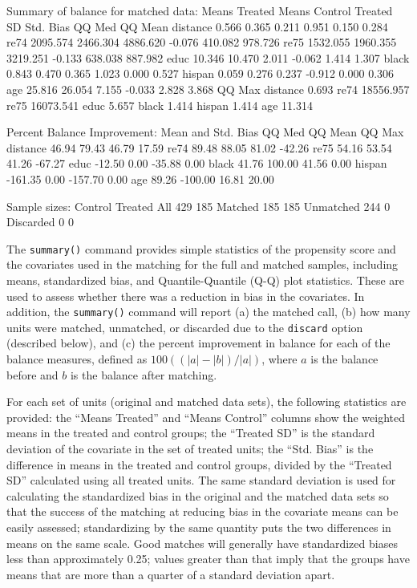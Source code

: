 \documentclass[oneside,letterpaper,titlepage]{article}
\begin{document}
\begin{enumerate}
\begin{Schunk}
\begin{Soutput}
Summary of balance for matched data:
         Means Treated Means Control Treated SD Std. Bias  QQ Med QQ Mean
distance         0.566         0.365      0.211     0.951   0.150   0.284
re74          2095.574      2466.304   4886.620    -0.076 410.082 978.726
re75          1532.055      1960.355   3219.251    -0.133 638.038 887.982
educ            10.346        10.470      2.011    -0.062   1.414   1.307
black            0.843         0.470      0.365     1.023   0.000   0.527
hispan           0.059         0.276      0.237    -0.912   0.000   0.306
age             25.816        26.054      7.155    -0.033   2.828   3.868
            QQ Max
distance     0.693
re74     18556.957
re75     16073.541
educ         5.657
black        1.414
hispan       1.414
age         11.314

Percent Balance Improvement:
         Mean and Std. Bias  QQ Med QQ Mean QQ Max
distance              46.94   79.43   46.79  17.59
re74                  89.48   88.05   81.02 -42.26
re75                  54.16   53.54   41.26 -67.27
educ                 -12.50    0.00  -35.88   0.00
black                 41.76  100.00   41.56   0.00
hispan              -161.35    0.00 -157.70   0.00
age                   89.26 -100.00   16.81  20.00

Sample sizes:
          Control Treated
All           429     185
Matched       185     185
Unmatched     244       0
Discarded       0       0
\end{Soutput}
\end{Schunk}
The \texttt{summary()} command provides simple statistics of the
propensity score and the covariates used in the matching for the full
and matched samples, including means, standardized bias, and
Quantile-Quantile (Q-Q) plot statistics.  These are used to assess
whether there was a reduction in bias in the covariates. In addition,
the \texttt{summary()} command will report (a) the matched call, (b)
how many units were matched, unmatched, or discarded due to the
\texttt{discard} option (described below), and (c) the percent
improvement in balance for each of the balance measures, defined as
$100((|a|-|b|)/|a|)$, where $a$ is the balance before and $b$ is the
balance after matching.

For each set of units (original and matched data sets), the following
statistics are provided: the ``Means Treated'' and ``Means Control''
columns show the weighted means in the treated and control groups; the
``Treated SD'' is the standard deviation of the covariate in the set
of treated units; the ``Std. Bias'' is the difference in means in the
treated and control groups, divided by the ``Treated SD'' calculated
using all treated units.  The same standard deviation is used for
calculating the standardized bias in the original and the matched data
sets so that the success of the matching at reducing bias in the
covariate means can be easily assessed; standardizing by the same
quantity puts the two differences in means on the same scale.  Good
matches will generally have standardized biases less than
approximately 0.25; values greater than that imply that the groups
have means that are more than a quarter of a standard deviation apart.


\end{enumerate}
\end{document}
